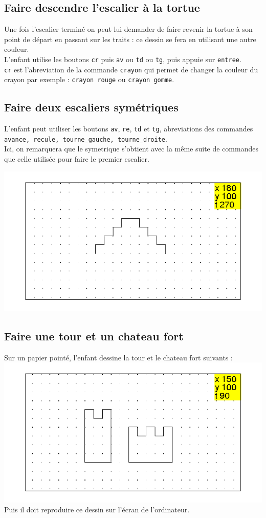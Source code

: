 \documentclass[a4paper,11pt]{book}
\begin{document}
\subsection{Faire descendre l'escalier \`a la tortue}
Une fois l'escalier termin\'e on peut lui demander de faire revenir la tortue 
\`a son point de d\'epart en passant sur les traits : ce dessin se fera en 
utilisant une autre couleur.\\
L'enfant utilise les boutons {\tt cr} puis {\tt av} ou {\tt td} ou {\tt tg}, 
puis appuie sur {\tt entree}.\\
 {\tt cr} est l'abreviation de la commande {\tt crayon} qui permet de changer 
la couleur du crayon par exemple : {\tt crayon rouge} ou {\tt crayon gomme}.
\subsection{Faire deux escaliers sym\'etriques}
L'enfant peut utiliser les boutons {\tt av}, {\tt re}, {\tt td} et {\tt tg}, 
abreviations des commandes 
{\tt avance, recule, tourne\_gauche, tourne\_droite}.\\
Ici, on remarquera que le symetrique s'obtient avec la m\^eme suite de 
commandes que celle utilis\'ee pour faire le premier escalier.\\ 
\begin{center}\includegraphics[width=\textwidth]{tortuee2}\end{center}
\subsection{Faire une tour et un chateau fort}
Sur un papier point\'e, l'enfant dessine la tour et le chateau fort suivants :\\
%
\includegraphics[width=\textwidth]{tortuetch} 
Puis il doit reproduire ce dessin sur l'\'ecran de l'ordinateur.
\end{document}

